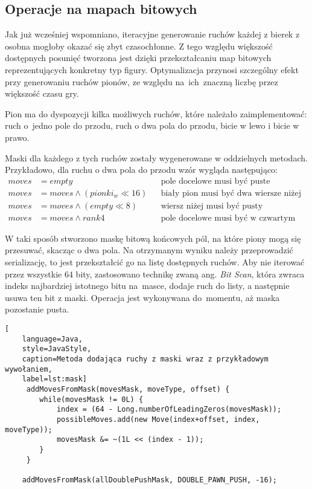 \subsection{Operacje na mapach bitowych}
\label{subsec:operacje-na-mapach-bitowych}

Jak już wcześniej wspomniano, iteracyjne generowanie ruchów każdej z bierek z osobna mogłoby okazać się zbyt czasochłonne.
Z tego względu większość dostępnych posunięć tworzona jest dzięki przekształcaniu map bitowych reprezentujących konkretny typ figury.
Optymalizacja przynosi szczególny efekt przy generowaniu ruchów pionów, ze względu na~ich~znaczną liczbę przez większość czasu gry.

Pion ma do dyspozycji kilka możliwych ruchów, które należało zaimplementować: ruch o~jedno pole do przodu, ruch o dwa pola do przodu, bicie w lewo i bicie w prawo.

Maski dla każdego z tych ruchów zostały wygenerowane w oddzielnych metodach.
Przykładowo, dla ruchu o dwa pola do przodu wzór wygląda następująco:
\begin{align*}
    moves & = empty && \text{pole docelowe musi być puste} \\
    moves & = moves \wedge (pionki_w\ll16) && \text{biały pion musi być dwa wiersze niżej}\\
    moves & = moves \wedge (empty\ll8) && \text{wiersz niżej musi być pusty}\\
    moves & = moves \wedge rank4 && \text{pole docelowe musi być w czwartym wierszu}
\end{align*}

W taki sposób stworzono maskę bitową końcowych pól, na które piony mogą się przesuwać, skacząc o dwa pola.
Na otrzymanym wyniku należy przeprowadzić serializację, to jest przekształcić go na listę dostępnych ruchów.
Aby nie iterować przez wszystkie 64 bity, zastosowano technikę zwaną ang. \emph{Bit Scan}, która zwraca indeks najbardziej istotnego bitu na~masce, dodaje ruch do listy, a następnie usuwa ten bit z maski.
Operacja jest wykonywana do~momentu, aż maska pozostanie pusta.
\begin{lstlisting}[
    language=Java,
    style=JavaStyle,
    caption=Metoda dodająca ruchy z maski wraz z przykładowym wywołaniem,
    label=lst:mask]
     addMovesFromMask(movesMask, moveType, offset) {
        while(movesMask != 0L) {
            index = (64 - Long.numberOfLeadingZeros(movesMask));
            possibleMoves.add(new Move(index+offset, index, moveType));
            movesMask &= ~(1L << (index - 1));
        }
     }

    addMovesFromMask(allDoublePushMask, DOUBLE_PAWN_PUSH, -16);

\end{lstlisting}

